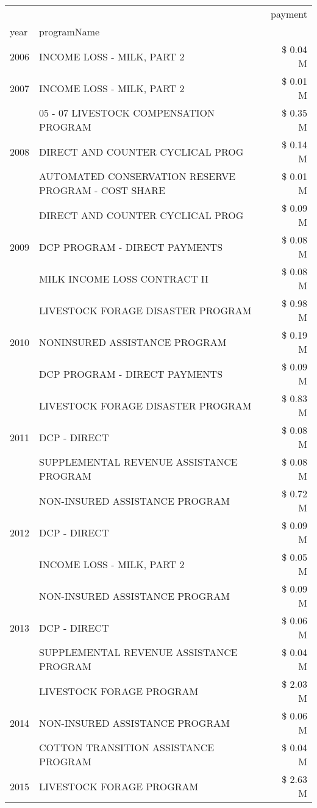 \begin{tabular}{llr}
\toprule
 &  & payment \\
year & programName &  \\
\midrule
2006 & INCOME LOSS - MILK, PART 2 & \$ 0.04 M \\
\cline{1-3}
2007 & INCOME LOSS - MILK, PART 2 & \$ 0.01 M \\
\cline{1-3}
\multirow[t]{3}{*}{2008} & 05 - 07 LIVESTOCK COMPENSATION PROGRAM & \$ 0.35 M \\
 & DIRECT AND COUNTER CYCLICAL PROG & \$ 0.14 M \\
 & AUTOMATED CONSERVATION RESERVE PROGRAM - COST SHARE & \$ 0.01 M \\
\cline{1-3}
\multirow[t]{3}{*}{2009} & DIRECT AND COUNTER CYCLICAL PROG & \$ 0.09 M \\
 & DCP PROGRAM - DIRECT PAYMENTS & \$ 0.08 M \\
 & MILK INCOME LOSS CONTRACT II & \$ 0.08 M \\
\cline{1-3}
\multirow[t]{3}{*}{2010} & LIVESTOCK FORAGE DISASTER  PROGRAM & \$ 0.98 M \\
 & NONINSURED ASSISTANCE PROGRAM & \$ 0.19 M \\
 & DCP PROGRAM - DIRECT PAYMENTS & \$ 0.09 M \\
\cline{1-3}
\multirow[t]{3}{*}{2011} & LIVESTOCK FORAGE DISASTER PROGRAM & \$ 0.83 M \\
 & DCP - DIRECT & \$ 0.08 M \\
 & SUPPLEMENTAL REVENUE ASSISTANCE PROGRAM & \$ 0.08 M \\
\cline{1-3}
\multirow[t]{3}{*}{2012} & NON-INSURED ASSISTANCE PROGRAM & \$ 0.72 M \\
 & DCP - DIRECT & \$ 0.09 M \\
 & INCOME LOSS - MILK, PART 2 & \$ 0.05 M \\
\cline{1-3}
\multirow[t]{3}{*}{2013} & NON-INSURED ASSISTANCE PROGRAM & \$ 0.09 M \\
 & DCP - DIRECT & \$ 0.06 M \\
 & SUPPLEMENTAL REVENUE ASSISTANCE PROGRAM & \$ 0.04 M \\
\cline{1-3}
\multirow[t]{3}{*}{2014} & LIVESTOCK FORAGE PROGRAM & \$ 2.03 M \\
 & NON-INSURED ASSISTANCE PROGRAM & \$ 0.06 M \\
 & COTTON TRANSITION ASSISTANCE PROGRAM & \$ 0.04 M \\
\cline{1-3}
\multirow[t]{3}{*}{2015} & LIVESTOCK FORAGE PROGRAM & \$ 2.63 M \\

\end{tabular}
